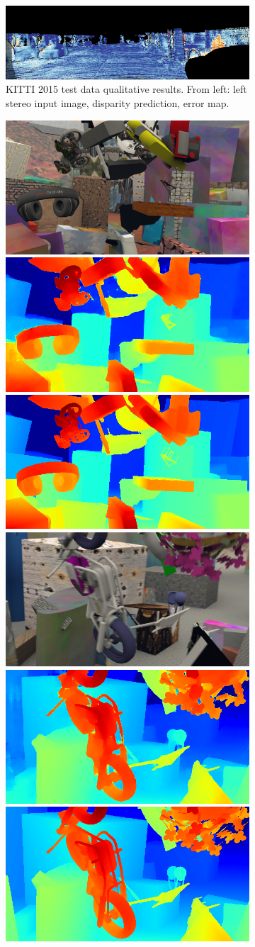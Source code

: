 \begin{figure}[p]
\begin{center}
\begin{subfigure}[t]{\linewidth}
			\includegraphics[width=0.31\linewidth]{results_kitti_2015/000004_10_error.png}
	        \caption{KITTI 2015 test data qualitative results. From left: left stereo input image, disparity prediction, error map.}
            \vspace{2 mm}
		\end{subfigure}
    		\begin{subfigure}[t]{\linewidth}
            \centering
			\includegraphics[width=0.31\linewidth]{results_scene_flow_test/1351_input.png}
			\includegraphics[width=0.31\linewidth]{results_scene_flow_test/1351_disp.png}
			\includegraphics[width=0.31\linewidth]{results_scene_flow_test/1351_gt.png}
            \vspace{1 mm}
			\includegraphics[width=0.31\linewidth]{results_scene_flow_test/2145_input.png}
			\includegraphics[width=0.31\linewidth]{results_scene_flow_test/2145_disp.png}
			\includegraphics[width=0.31\linewidth]{results_scene_flow_test/2145_gt.png}

\end{subfigure}
\end{center}
\end{figure}
